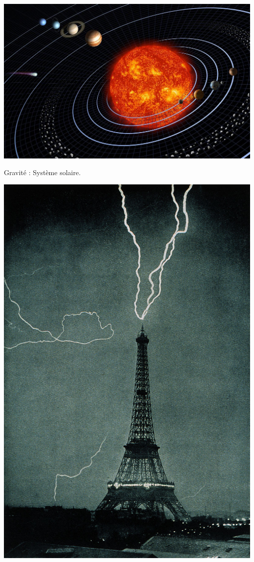 \marginpar
{
	 \captionsetup{type=figure}
	\includegraphics[width=\marginparwidth]{SM/solaire.jpg}
	\captionsetup{type=subfigure}\caption{Gravité : Système solaire.}
	\includegraphics[width=\marginparwidth]{SM/foudre.jpg}
}
